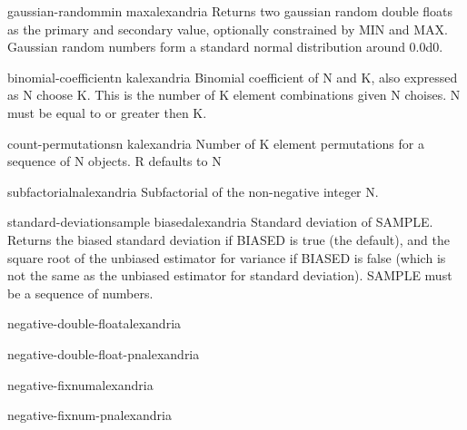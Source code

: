 \begin{function}{gaussian-random}{\op min max}{alexandria}{}
  Returns two gaussian random double floats as the primary and secondary value,
optionally constrained by MIN and MAX. Gaussian random numbers form a standard
normal distribution around 0.0d0.
\end{function}

\begin{function}{binomial-coefficient}{n k}{alexandria}{}
  Binomial coefficient of N and K, also expressed as N choose K. This is the
number of K element combinations given N choises. N must be equal to or
greater then K.
\end{function}

\begin{function}{count-permutations}{n \op k}{alexandria}{}
  Number of K element permutations for a sequence of N objects.
R defaults to N
\end{function}

\begin{function}{subfactorial}{n}{alexandria}{}
  Subfactorial of the non-negative integer N.
\end{function}

\begin{function}{standard-deviation}{sample \key biased}{alexandria}{}
  Standard deviation of SAMPLE. Returns the biased standard deviation if
BIASED is true (the default), and the square root of the unbiased estimator
for variance if BIASED is false (which is not the same as the unbiased
estimator for standard deviation). SAMPLE must be a sequence of numbers.
\end{function}

\begin{type}{negative-double-float}{}{alexandria}{}
  
\end{type}

\begin{function}{negative-double-float-p}{n}{alexandria}{}
  
\end{function}

\begin{type}{negative-fixnum}{}{alexandria}{}
  
\end{type}

\begin{function}{negative-fixnum-p}{n}{alexandria}{}
  
\end{function}

